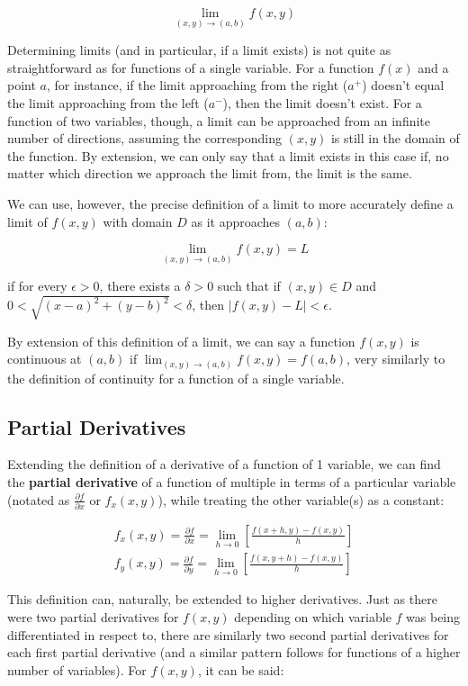 \documentclass[12pt]{article}
\begin{document}
$$\lim_{(x,y)\to(a,b)}f(x,y)$$

Determining limits (and in particular, if a limit exists) is not quite as straightforward as for functions of a single variable. For a function $f(x)$ and a point $a$, for instance, if the limit approaching from the right ($a^{+}$) doesn't equal the limit approaching from the left ($a^{-}$), then the limit doesn't exist. For a function of two variables, though, a limit can be approached from an infinite number of directions, assuming the corresponding $(x,y)$ is still in the domain of the function. By extension, we can only say that a limit exists in this case if, no matter which direction we approach the limit from, the limit is the same.

We can use, however, the precise definition of a limit to more accurately define a limit of $f(x,y)$ with domain $D$ as it approaches $(a,b)$:

$$\lim_{(x,y)\to(a,b)} f(x,y) = L$$

if for every $\epsilon > 0$, there exists a $\delta >0$ such that if $(x,y)\in D$ and $0<\sqrt{(x-a)^2+(y-b)^2}<\delta$, then $|f(x,y)-L|<\epsilon$.

By extension of this definition of a limit, we can say a function $f(x,y)$ is continuous at $(a,b)$ if $\lim_{(x,y)\to(a,b)} f(x,y) = f(a,b)$, very similarly to the definition of continuity for a function of a single variable.

\subsection{Partial Derivatives}

Extending the definition of a derivative of a function of 1 variable, we can find the \textbf{partial derivative} of a function of multiple in terms of a particular variable (notated as $\frac{\partial f}{\partial x}$ or $f_x(x,y)$), while treating the other variable(s) as a constant:

\begin{equation}
    \begin{split}
        f_x(x,y) = \frac{\partial f}{\partial x} = \lim_{h\to0}[ \frac{f(x+h,y)-f(x,y)}{h}]\\
        f_y(x,y) = \frac{\partial f}{\partial y} = \lim_{h\to0}[ \frac{f(x,y+h)-f(x,y)}{h}]
    \end{split}
\end{equation}

This definition can, naturally, be extended to higher derivatives. Just as there were two partial derivatives for $f(x,y)$ depending on which variable $f$ was being differentiated in respect to, there are similarly two second partial derivatives for each first partial derivative (and a similar pattern follows for functions of a higher number of variables). For $f(x,y)$, it can be said:
\end{document}
